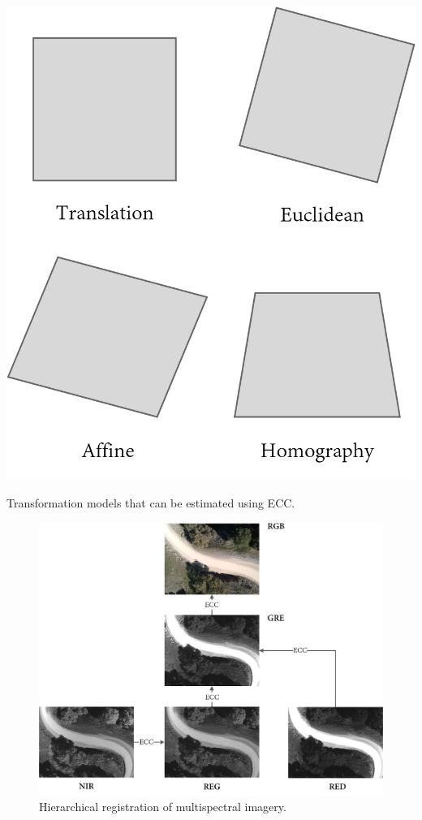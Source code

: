 \begin{marginfigure}[-2cm]
    \centering
    \includegraphics{figs/image_fusion/motion_models.png}
    \caption{Transformation models that can be estimated using ECC.}
    \label{fig:ecc_motion_models}
\end{marginfigure}

\begin{figure}[ht]
    \centering
    \includegraphics[width=\linewidth]{figs/image_fusion/ecc_hierarchy.png}
    \caption{Hierarchical registration of multispectral imagery.}
	\label{fig:ecc_hierarchy}
\end{figure}

